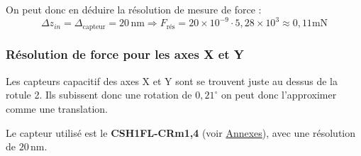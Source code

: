 \documentclass[a4paper, 11pt]{article} %
\begin{document}
On peut donc en déduire la résolution de mesure de force :
\[
\Delta z_{in} = \Delta_{\text{capteur}} = 20\, \text{nm}  \Rightarrow F_{\text{rés}} = 20 \times 10^{-9} \cdot 5,28 \times 10^{3} \approx 0,11 \text{mN}
\]


\subsubsection*{Résolution de force pour les axes X et Y}

Les capteurs capacitif des axes X et Y sont se trouvent juste au dessus de la rotule 2. Ils subissent donc une rotation de $0,21^\circ$ on peut donc l'approximer comme une translation.

Le capteur utilisé est le \textbf{CSH1FL-CRm1,4} (voir \hyperref[Annexes]{Annexes}), avec une résolution de $20\, \text{nm}$.
\end{document}
